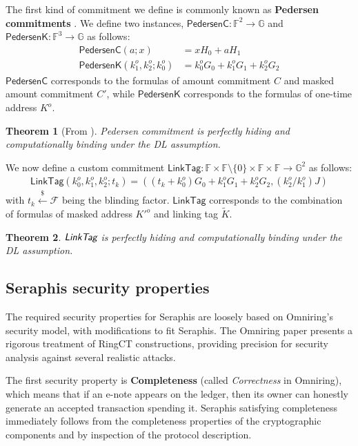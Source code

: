 \documentclass{article}
\theoremstyle{plain}
\newtheorem{theorem}{Theorem}[section]
\theoremstyle{remark}
\begin{document}
\noindent The first kind of commitment we define is commonly known as \textbf{Pedersen commitments} \cite{pedersen}. We define two instances, $\textsf{PedersenC}:\mathbb{F}^2\rightarrow\mathbb{G}$ and $\textsf{PedersenK}:\mathbb{F}^3\rightarrow\mathbb{G}$ as follows:
\begin{align*}
\textsf{PedersenC}(a; x) &= x H_0 + a H_1 \\
\textsf{PedersenK}(k_1^o, k_2^o; k_0^o) &= k_0^o G_0 + k_1^o G_1 + k_2^o G_2
\end{align*}
$\textsf{PedersenC}$ corresponds to the formulas of amount commitment $C$ and masked amount commitment $C'$, while $\textsf{PedersenK}$ corresponds to the formulas of one-time address $K^o$.
\begin{theorem}[From \cite{pedersen}]\label{thm-pedersen}
Pedersen commitment is perfectly hiding and computationally binding under the DL assumption.
\end{theorem}

\noindent We now define a custom commitment $\textsf{LinkTag}:\mathbb{F}\times\mathbb{F}\setminus\{0\}\times\mathbb{F}\times\mathbb{F}\rightarrow\mathbb{G}^2$ as follows:
\begin{align*}
\textsf{LinkTag}(k_0^o, k_1^o, k_2^o; t_k) = ((t_k + k_0^o) G_0 + k_1^o G_1 + k_2^o G_2, (k_2^o/k_1^o) J)
\end{align*}
with $t_k\xleftarrow{\$}\mathcal{F}$ being the blinding factor. $\textsf{LinkTag}$ corresponds to the combination of formulas of masked address $K'^o$ and linking tag $\tilde{K}$.

\begin{theorem}\label{thm-linktag}
$\emph{\textsf{LinkTag}}$ is perfectly hiding and computationally binding under the DL assumption.
\end{theorem}

\subsection{Seraphis security properties}\label{sec-thm}
The required security properties for Seraphis are loosely based on Omniring's security model, with modifications to fit Seraphis. The Omniring paper presents a rigorous treatment of RingCT constructions, providing precision for security analysis against several realistic attacks.

The first security property is \textbf{Completeness} (called \textit{Correctness} in Omniring), which means that if an e-note appears on the ledger, then its owner can honestly generate an accepted transaction spending it. Seraphis satisfying completeness immediately follows from the completeness properties of the cryptographic components and by inspection of the protocol description.
\end{document}
